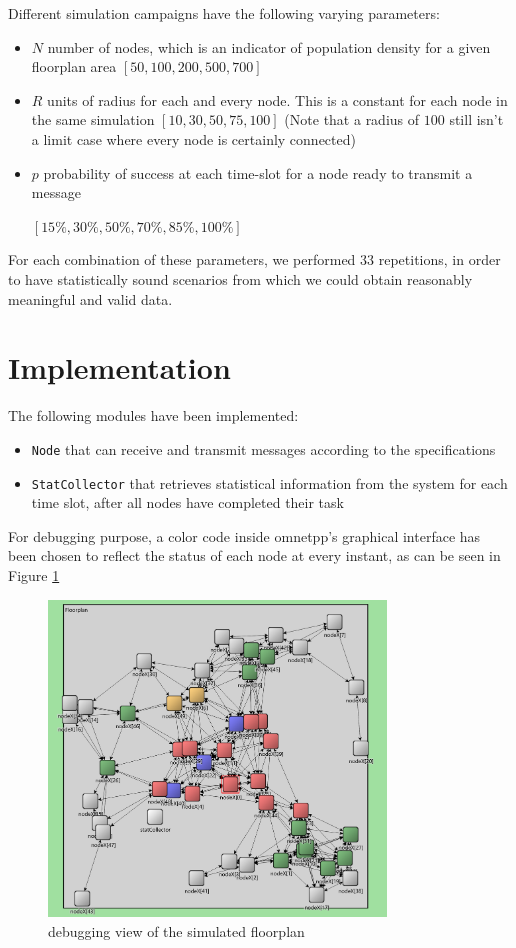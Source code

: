 Different simulation campaigns have the following varying parameters:
\begin{itemize}
\item $N$ number of nodes, which is an indicator of population density for a given floorplan area $[50, 100, 200, 500, 700]$
\item $R$ units of radius for each and every node. This is a constant for each node in the same simulation $[10, 30, 50, 75, 100]$ (Note that a radius of $100$ still isn't a limit case where every node is certainly connected)
\item $p$ probability of success at each time-slot for a node ready to transmit a message 

$[15\%, 30\%, 50\%, 70\%, 85\%, 100\%]$
\end{itemize}
For each combination of these parameters, we performed $33$ repetitions, in order to have statistically sound scenarios from which we could obtain reasonably meaningful and valid data.
\section{Implementation}
The following modules have been implemented:
\begin{itemize}
\item \texttt{Node} that can receive and transmit messages according to the specifications
\item \texttt{StatCollector} that retrieves statistical information from the system for each time slot, after all nodes have completed their task
\end{itemize}
For debugging purpose, a color code inside omnetpp's graphical interface has been chosen to reflect the status of each node at every instant, as can be seen in Figure \ref{fig:floorplan}

\begin{figure}
\centering
\includegraphics[width=0.8\textwidth]{./images/floorplan3.png}
\caption{debugging view of the simulated floorplan}
\label{fig:floorplan}
\end{figure}

